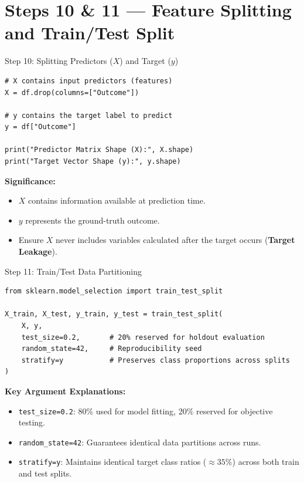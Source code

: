 \documentclass[aspectratio=169,11pt]{beamer}
\newcommand{\code}[1]{\texttt{#1}}
\newcommand{\smallgap}{\vspace{0.35em}}
\begin{document}
\section{Steps 10 \& 11 — Feature Splitting and Train/Test Split}

\begin{frame}[fragile]{Step 10: Splitting Predictors ($X$) and Target ($y$)}
\begin{lstlisting}[style=pythonstyle]
# X contains input predictors (features)
X = df.drop(columns=["Outcome"])

# y contains the target label to predict
y = df["Outcome"]

print("Predictor Matrix Shape (X):", X.shape)
print("Target Vector Shape (y):", y.shape)
\end{lstlisting}

\smallgap
\textbf{Significance:}
\begin{itemize}
  \item $X$ contains information available at prediction time.
  \item $y$ represents the ground-truth outcome.
  \item Ensure $X$ never includes variables calculated after the target occurs (\textbf{Target Leakage}).
\end{itemize}
\end{frame}

\begin{frame}[fragile]{Step 11: Train/Test Data Partitioning}
\begin{lstlisting}[style=pythonstyle]
from sklearn.model_selection import train_test_split

X_train, X_test, y_train, y_test = train_test_split(
    X, y,
    test_size=0.2,       # 20% reserved for holdout evaluation
    random_state=42,     # Reproducibility seed
    stratify=y           # Preserves class proportions across splits
)
\end{lstlisting}

\smallgap
\textbf{Key Argument Explanations:}
\begin{itemize}
  \item \code{test\_size=0.2}: 80\% used for model fitting, 20\% reserved for objective testing.
  \item \code{random\_state=42}: Guarantees identical data partitions across runs.
  \item \code{stratify=y}: Maintains identical target class ratios ($\approx 35\%$) across both train and test splits.
\end{itemize}
\end{frame}
\end{document}
